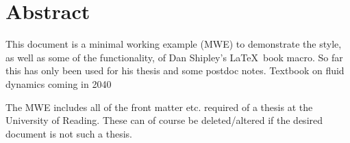 \chapter{Abstract}

This document is a minimal working example (MWE) to demonstrate the style, as well as some of the functionality, of Dan Shipley's \LaTeX\ book macro.
So far this has only been used for his thesis \parencite{phd:Shipley2021}  and some postdoc notes.
Textbook on fluid dynamics coming in 2040\textellipsis

The MWE includes all of the front matter etc. required of a thesis at the University of Reading.
These can of course be deleted/altered if the desired document is not such a thesis.